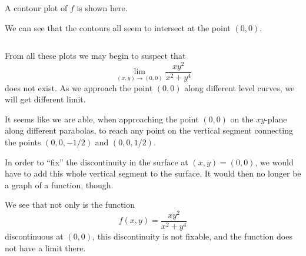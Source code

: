 \documentclass[aspectratio=169]{beamer}
\begin{document}
\begin{frame}[plain]
\begin{columns}[T]
\begin{column}{6.3cm}
            A contour plot of $f$ is shown here.

            We can see that the contours all seem to intersect at the point
            $(0,0)$.
        \end{column}
    \end{columns}
\end{frame}
\begin{frame}
    From all these plots we may begin to suspect that \[\lim_{(x,y)\to(0,0)}
    \frac{xy^2}{x^2+y^4}\]
    does not exist. As we approach the point $(0,0)$ along different level
    curves, we will get different limit.

\end{frame}
\begin{frame}
    It seems like we are able, when approaching the point $(0,0)$ on the
    $xy$-plane along different parabolas, to reach any point on the vertical
    segment connecting the points $(0,0,-1/2)$ and $(0,0,1/2)$.\pause

    In order to ``fix'' the discontinuity in the surface at $(x,y) = (0,0)$, we
    would have to add this whole vertical segment to the surface. It would then
    no longer be a graph of a function, though.\pause

    We see that not only is the function 
    \[f(x,y) = \frac{xy^2}{x^2 + y^4}\]
    discontinuous at $(0,0)$, this discontinuity is not fixable, and the
    function does not have a limit there.
\end{frame}
\end{document}
